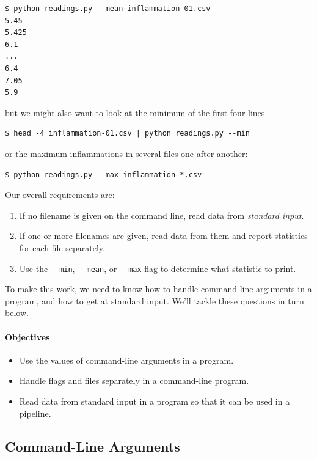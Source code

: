 \documentclass[]{book}
\newcommand{\gdef}[2]{\emph{#2}}
\begin{document}
\begin{verbatim}
$ python readings.py --mean inflammation-01.csv
5.45
5.425
6.1
...
6.4
7.05
5.9
\end{verbatim}

but we might also want to look at the minimum of the first four lines

\begin{verbatim}
$ head -4 inflammation-01.csv | python readings.py --min
\end{verbatim}

or the maximum inflammations in several files one after another:

\begin{verbatim}
$ python readings.py --max inflammation-*.csv
\end{verbatim}

Our overall requirements are:

\begin{enumerate}
\item
  If no filename is given on the command line, read data from
  \gdef{g:standard-input}{standard input}.
\item
  If one or more filenames are given, read data from them and report
  statistics for each file separately.
\item
  Use the \texttt{-{}-min}, \texttt{-{}-mean}, or \texttt{-{}-max} flag
  to determine what statistic to print.
\end{enumerate}

To make this work, we need to know how to handle command-line arguments
in a program, and how to get at standard input. We'll tackle these
questions in turn below.

\mbox{}\paragraph{Objectives}

\begin{itemize}
\item
  Use the values of command-line arguments in a program.
\item
  Handle flags and files separately in a command-line program.
\item
  Read data from standard input in a program so that it can be used in a
  pipeline.
\end{itemize}

\subsection{Command-Line Arguments}
\end{document}
